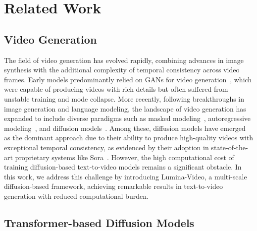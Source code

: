 \section{Related Work}
\label{sec:related_work}
\subsection{Video Generation}

The field of video generation has evolved rapidly, combining advances in image synthesis with the additional complexity of temporal consistency across video frames. 
Early models predominantly relied on GANs for video generation~\citep{TGAN,StyleGAN-V,MoCoGAN}, which were capable of producing videos with rich details but often suffered from unstable training and mode collapse. 
More recently, following breakthroughs in image generation and language modeling, the landscape of video generation has expanded to include diverse paradigms such as masked modeling~\citep{Phenaki,MAGVIT,MAGVIT-v2}, autoregressive modeling~\citep{CogVideo,VideoPoet,Video-LaViT,luminamgpt}, and diffusion models~\citep{PYoCo,WALT,StableVideoDiffusion,CogVideoX}. 
Among these, diffusion models have emerged as the dominant approach due to their ability to produce high-quality videos with exceptional temporal consistency, as evidenced by their adoption in state-of-the-art proprietary systems like Sora~\citep{openai2024sora}. However, the high computational cost of training diffusion-based text-to-video models remains a significant obstacle. 
In this work, we address this challenge by introducing Lumina-Video, a multi-scale diffusion-based framework, achieving remarkable results in text-to-video generation with reduced computational burden.

\subsection{Transformer-based Diffusion Models}

